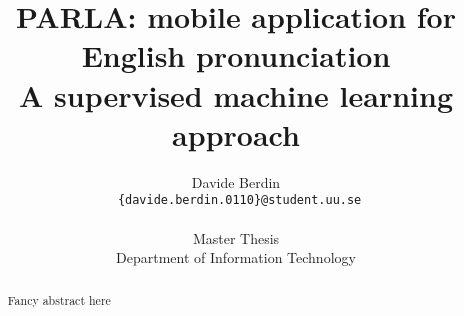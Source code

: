 \documentclass{report}
\title{PARLA: mobile application for English pronunciation \\ A supervised machine learning approach}
\author{Davide Berdin \\
  \texttt{ \{davide.berdin.0110\}@student.uu.se} \\
  \\ Master Thesis
  \\ Department of Information Technology}
\newcommand\blankpage{%
    \null
    \thispagestyle{empty}%
    \addtocounter{page}{-1}%
    \newpage}
\begin{document}
\maketitle


\blankpage

\blankpage

\begin{abstract}
Fancy abstract here
\end{abstract}

\blankpage

\renewcommand{\abstractname}{Acknowledgements}
\begin{abstract}

\end{abstract}

\blankpage

\tableofcontents{}

\listoffigures







%





{
	
	
}

\begin{appendices}


%
\end{appendices}


\end{document}

